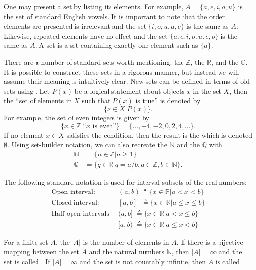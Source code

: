 One may present a set by listing its elements.
For example, $A= \{ a,e,i,o,u \}$ is the set of standard English vowels.
It is important to note that the order elements are presented is irrelevant and the set $\{ i,o,u,a,e \}$ is the same as $A$.
Likewise, repeated elements have no effect and the set $\{ a,e,i,o,u,e,o \}$ is the same as $A$.
A  set is a set containing exactly one element such as $\{a\}$.

There are a number of standard sets worth mentioning: the  $\mathbb{Z}$, the  $\mathbb{R}$, and the  $\mathbb{C}$.
It is possible to construct these sets in a rigorous manner, but instead we will assume their meaning is intuitively clear.
New sets can be defined in terms of old sets using .
Let $P(x)$ be a logical statement about objects $x$ in the set $X$, then the ``set of elements in $X$ such that $P(x)$ is true'' is denoted by
\[ \{ x\in X | P(x) \}. \]
For example, the set of even integers is given by
\[ \{ x\in \mathbb{Z} | \textrm{``}x\textrm{ is even''} \} = \{ \ldots,-4,-2,0,2,4,\ldots \}. \]
If no element $x\in X$ satisfies the condition, then the result is the  which is denoted $\emptyset$.
Using set-builder notation, we can also recreate the  $\mathbb{N}$ and the  $\mathbb{Q}$ with
\begin{align*}
\mathbb{N} & = \{ n\in \mathbb{Z} | n\geq 1 \} \\
\mathbb{Q} & = \{ q\in \mathbb{R} | q=a/b, a\in \mathbb{Z}, b\in \mathbb{N} \}.
\end{align*}

The following standard notation is used for interval subsets of the real numbers:
\begin{align*}
\textrm{Open interval:} \; &  (a,b) \triangleq \{ x\in \mathbb{R} | a<x<b \} \\
\textrm{Closed interval:} \; & [a,b] \;\;\!\! \triangleq \{ x\in \mathbb{R} | a \leq x \leq b \} \\
\textrm{Half-open intervals:} \; & (a,b] \;\! \triangleq \{ x\in \mathbb{R} | a < x \leq b \} \\
& [a,b) \;\! \triangleq \{ x\in \mathbb{R} | a \leq x < b \}
\end{align*}

\begin{definition}
For a finite set $A$, the  $|A|$ is the number of elements in $A$.
If there is a bijective mapping between the set $A$ and the natural numbers $\mathbb{N}$, then $|A| = \infty$ and the set is called .
If $|A| = \infty$ and the set is not countably infinite, then $A$ is called .
\end{definition}

